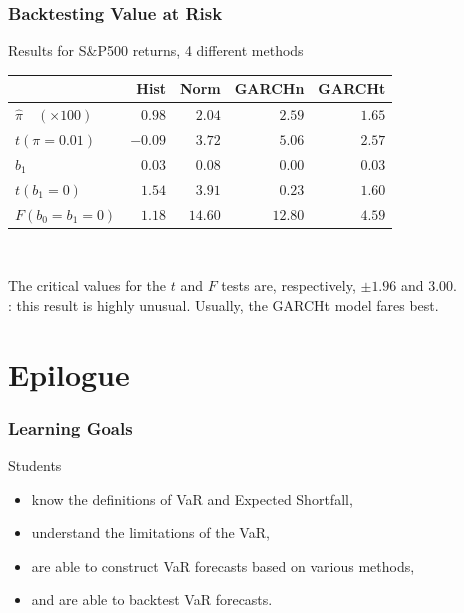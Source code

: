 \begin{frame}%

\frametitle{Backtesting Value at Risk}



\begin{block}{Results for S\&P500 returns, 4 different methods}
\begin{center}
\begin{tabular}{l|rrrr}
\toprule
& Hist & Norm &  GARCHn & GARCHt \\ \midrule
$\hat{\pi}\quad (\times 100)$ & $0.98$ & $2.04$ & $2.59$ & $1.65$\\
$t(\pi =0.01)$ & $-0.09$ & $3.72$ & $5.06$ & $2.57$ \\
$\hat{b}_{1}$ & $0.03$ & $0.08$ & $0.00$ & $0.03$\\
$t(b_{1}=0)$ & $1.54$ & $3.91$ & $0.23$ & $1.60$  \\
$F(b_{0}=b_{1}=0)$ & $1.18$ & $14.60$ & $12.80$ & $4.59$\\ \bottomrule
\end{tabular}\\
\end{center}
\small The critical values for the $t$ and $F$ tests are, respectively, $\pm 1.96$ and $3.00$.\\
: this result is highly unusual. Usually, the GARCHt model fares best.
\end{block}
\end{frame}%

\section{Epilogue}
\begin{frame}
\frametitle{Learning Goals}
Students
\begin{itemize}
\item know the definitions of VaR and Expected Shortfall,
\item understand the limitations of the VaR,
\item are able to construct VaR forecasts based on various methods,
\item and are able to backtest VaR forecasts.
\end{itemize}
\end{frame}

